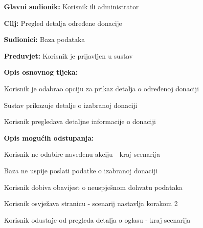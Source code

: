 					\noindent {}
					\begin{packed_item}
	
						\item \textbf{Glavni sudionik: }Korisnik ili administrator
						\item  \textbf{Cilj:} Pregled detalja određene donacije
						\item  \textbf{Sudionici:} Baza podataka
						\item  \textbf{Preduvjet:} Korisnik je prijavljen u sustav
						\item  \textbf{Opis osnovnog tijeka:}
						
						\item[] \begin{packed_enum}
							\item Korisnik je odabrao opciju za prikaz detalja o određenoj donaciji
							\item Sustav prikazuje detalje o izabranoj donaciji
							\item Korisnik pregledava detaljne informacije o donaciji
						\end{packed_enum}

						\item  \textbf{Opis mogućih odstupanja:}

						\item[] \begin{packed_item}
							\item[1.a] Korisnik ne odabire navedenu akciju - kraj scenarija
							\item[2.a] Baza ne uspije poslati podatke o izabranoj donaciji
							\item[] \begin{packed_enum}
								
								\item Korisnik dobiva obavijest o neuspješnom dohvatu podataka
								\item
									\begin{packed_enum}
										\item Korisnik osvježava stranicu - scenarij nastavlja korakom 2
										\item Korisnik odustaje od pregleda detalja o oglasu - kraj scenarija
									\end{packed_enum}	
							
							\end{packed_enum}	
						\end{packed_item}	
					\end{packed_item}

